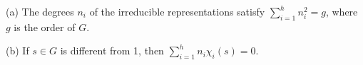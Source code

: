 (a) The degrees $n_i$ of the irreducible representations satisfy $\sum_{i=1}^{h} n_i^2 = g$, where $g$ is the order of $G$.

(b) If $s \in G$ is different from 1, then $\sum_{i=1}^{h} n_i \chi_i(s) = 0$.
